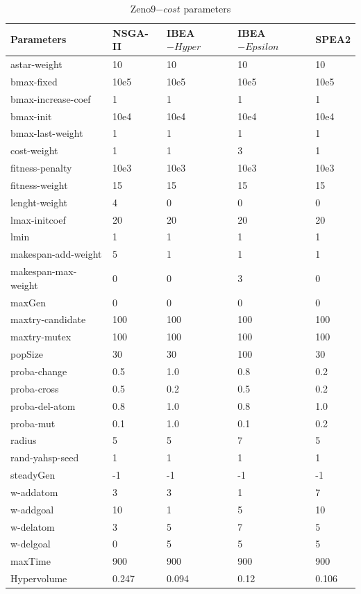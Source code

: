 \documentclass[a4paper,10pt]{article}
\begin{document}
\begin{table}[h]
\scriptsize
\begin{tabular}{|l|l|l|l|l|}

\hline 
Parameters  	&	NSGA-II 	&	IBEA$-{Hyper}$	&	IBEA$-{Epsilon}$	&	SPEA2	\\
\hline
astar-weight	&	10	&	10	&	10	&	10	\\
bmax-fixed	&	10e5	&	10e5	&	10e5	&	10e5	\\
bmax-increase-coef	&	1	&	1	&	1	&	1	\\
bmax-init	&	10e4	&	10e4	&	10e4	&	10e4	\\
bmax-last-weight	&	1	&	1	&	1	&	1	\\
cost-weight	&	1	&	1	&	3	&	1	\\
fitness-penalty	&	10e3	&	10e3	&	10e3	&	10e3	\\
fitness-weight	&	15	&	15	&	15	&	15	\\
lenght-weight	&	4	&	0	&	0	&	0	\\
lmax-initcoef	&	20	&	20	&	20	&	20	\\
lmin	&	1	&	1	&	1	&	1	\\
makespan-add-weight	&	5	&	1	&	1	&	1	\\
makespan-max-weight	&	0	&	0	&	3	&	0	\\
maxGen	&	0	&	0	&	0	&	0	\\
maxtry-candidate	&	100	&	100	&	100	&	100	\\
maxtry-mutex	&	100	&	100	&	100	&	100	\\
popSize	&	30	&	30	&	100	&	30	\\
proba-change	&	0.5	&	1.0	&	0.8	&	0.2	\\
proba-cross	&	0.5	&	0.2	&	0.5	&	0.2	\\
proba-del-atom	&	0.8	&	1.0	&	0.8	&	1.0	\\
proba-mut	&	0.1	&	1.0	&	0.1	&	0.2	\\
radius	&	5	&	5	&	7	&	5	\\
rand-yahsp-seed	&	1	&	1	&	1	&	1	\\
steadyGen	&	-1	&	-1	&	-1	&	-1	\\
w-addatom	&	3	&	3	&	1	&	7	\\
w-addgoal	&	10	&	1	&	5	&	10	\\
w-delatom	&	3	&	5	&	7	&	5	\\
w-delgoal	&	0	&	5	&	5	&	5	\\
maxTime	&	900	&	900	&	900	&	900	\\
\hline
Hypervolume	&	0.247	&	0.094	&	 0.12	&	0.106	\\
\hline


\end{tabular}
\caption{Zeno9$-{cost}$ parameters}
\end{table}
\end{document}
